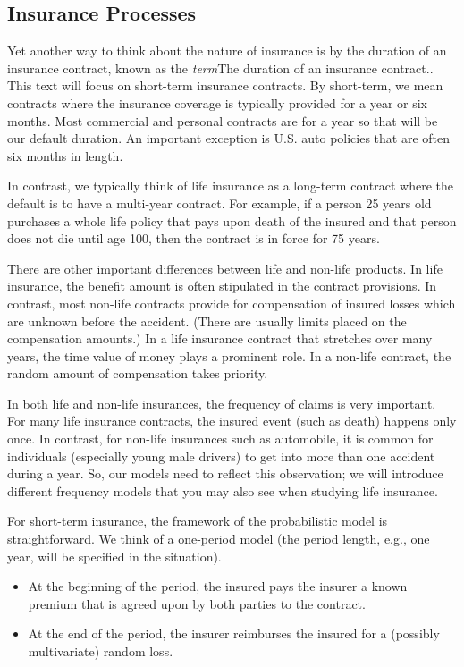\documentclass[]{book}
\theoremstyle{definition}
\theoremstyle{definition}
\theoremstyle{definition}
\theoremstyle{remark}
\begin{document}
\subsection{Insurance Processes}\label{S:InsProcesses}

Yet another way to think about the nature of insurance is by the
duration of an insurance contract, known as the \emph{term}{The duration
of an insurance contract.}. This text will focus on short-term insurance
contracts. By short-term, we mean contracts where the insurance coverage
is typically provided for a year or six months. Most commercial and
personal contracts are for a year so that will be our default duration.
An important exception is U.S. auto policies that are often six months
in length.

In contrast, we typically think of life insurance as a long-term
contract where the default is to have a multi-year contract. For
example, if a person 25 years old purchases a whole life policy that
pays upon death of the insured and that person does not die until age
100, then the contract is in force for 75 years.

There are other important differences between life and non-life
products. In life insurance, the benefit amount is often stipulated in
the contract provisions. In contrast, most non-life contracts provide
for compensation of insured losses which are unknown before the
accident. (There are usually limits placed on the compensation amounts.)
In a life insurance contract that stretches over many years, the time
value of money plays a prominent role. In a non-life contract, the
random amount of compensation takes priority.

In both life and non-life insurances, the frequency of claims is very
important. For many life insurance contracts, the insured event (such as
death) happens only once. In contrast, for non-life insurances such as
automobile, it is common for individuals (especially young male drivers)
to get into more than one accident during a year. So, our models need to
reflect this observation; we will introduce different frequency models
that you may also see when studying life insurance.

For short-term insurance, the framework of the probabilistic model is
straightforward. We think of a one-period model (the period length,
e.g., one year, will be specified in the situation).

\begin{itemize}
\item
  At the beginning of the period, the insured pays the insurer a known
  premium that is agreed upon by both parties to the contract.
\item
  At the end of the period, the insurer reimburses the insured for a
  (possibly multivariate) random loss.
\end{itemize}
\end{document}
